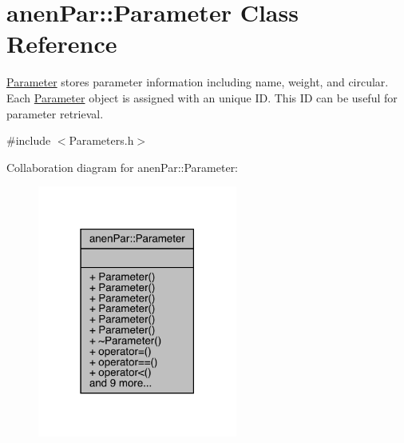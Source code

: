 \hypertarget{classanen_par_1_1_parameter}{}\section{anen\+Par\+:\+:Parameter Class Reference}
\label{classanen_par_1_1_parameter}


\mbox{\hyperlink{classanen_par_1_1_parameter}{Parameter}} stores parameter information including name, weight, and circular. Each \mbox{\hyperlink{classanen_par_1_1_parameter}{Parameter}} object is assigned with an unique ID. This ID can be useful for parameter retrieval.  




{\ttfamily \#include $<$Parameters.\+h$>$}



Collaboration diagram for anen\+Par\+:\+:Parameter\+:
\nopagebreak
\begin{figure}[H]
\begin{center}
\leavevmode
\includegraphics[width=186pt]{classanen_par_1_1_parameter__coll__graph}
\end{center}
\end{figure}
